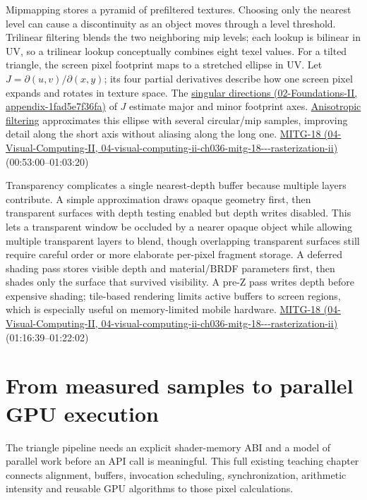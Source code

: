 Mipmapping stores a pyramid of prefiltered textures. Choosing only the nearest level can cause a discontinuity as an object moves through a level threshold. Trilinear filtering blends the two neighboring mip levels; each lookup is bilinear in UV, so a trilinear lookup conceptually combines eight texel values. For a tilted triangle, the screen pixel footprint maps to a stretched ellipse in UV. Let \(J=\partial(u,v)/\partial(x,y)\); its four partial derivatives describe how one screen pixel expands and rotates in texture space. The \href{../02-Foundations-II/main.pdf\#nameddest=appendix-1fad5e7f36fa}{singular directions (02-Foundations-II, appendix-1fad5e7f36fa)} of \(J\) estimate major and minor footprint axes. \hyperref[appendix-d5b3c692d9f0]{Anisotropic filtering} approximates this ellipse with several circular/mip samples, improving detail along the short axis without aliasing along the long one. \href{../04-Visual-Computing-II/main.pdf\#nameddest=04-visual-computing-ii-ch036-mitg-18---rasterization-ii}{MITG-18 (04-Visual-Computing-II, 04-visual-computing-ii-ch036-mitg-18-\/-\/-rasterization-ii)} (00:53:00--01:03:20)

Transparency complicates a single nearest-depth buffer because multiple layers contribute. A simple approximation draws opaque geometry first, then transparent surfaces with depth testing enabled but depth writes disabled. This lets a transparent window be occluded by a nearer opaque object while allowing multiple transparent layers to blend, though overlapping transparent surfaces still require careful order or more elaborate per-pixel fragment storage. A deferred shading pass stores visible depth and material/BRDF parameters first, then shades only the surface that survived visibility. A pre-Z pass writes depth before expensive shading; tile-based rendering limits active buffers to screen regions, which is especially useful on memory-limited mobile hardware. \href{../04-Visual-Computing-II/main.pdf\#nameddest=04-visual-computing-ii-ch036-mitg-18---rasterization-ii}{MITG-18 (04-Visual-Computing-II, 04-visual-computing-ii-ch036-mitg-18-\/-\/-rasterization-ii)} (01:16:39--01:22:02)

\section{From measured samples to parallel GPU execution}\label{03-visual-computing-i-ch015-from-measured-samples-to-parallel-gpu-execution}

The triangle pipeline needs an explicit shader-memory ABI and a model of parallel work before an API call is meaningful. This full existing teaching chapter connects alignment, buffers, invocation scheduling, synchronization, arithmetic intensity and reusable GPU algorithms to those pixel calculations.


